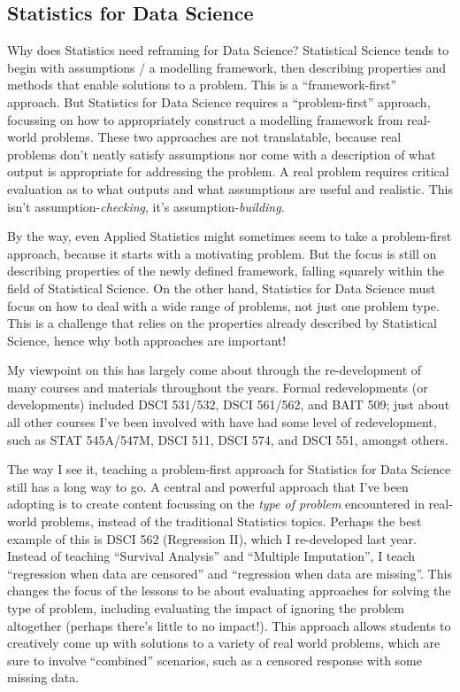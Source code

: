 \documentclass[]{article}
\begin{document}
\hypertarget{statistics-for-data-science}{%
\subsection{Statistics for Data Science}\label{statistics-for-data-science}}

Why does Statistics need reframing for Data Science? Statistical Science tends to begin with assumptions / a modelling framework, then describing properties and methods that enable solutions to a problem. This is a ``framework-first'' approach. But Statistics for Data Science requires a ``problem-first'' approach, focussing on how to appropriately construct a modelling framework from real-world problems. These two approaches are not translatable, because real problems don't neatly satisfy assumptions nor come with a description of what output is appropriate for addressing the problem. A real problem requires critical evaluation as to what outputs and what assumptions are useful and realistic. This isn't assumption-\emph{checking}, it's assumption-\emph{building}.

By the way, even Applied Statistics might sometimes seem to take a problem-first approach, because it starts with a motivating problem. But the focus is still on describing properties of the newly defined framework, falling squarely within the field of Statistical Science. On the other hand, Statistics for Data Science must focus on how to deal with a wide range of problems, not just one problem type. This is a challenge that relies on the properties already described by Statistical Science, hence why both approaches are important!

My viewpoint on this has largely come about through the re-development of many courses and materials throughout the years. Formal redevelopments (or developments) included DSCI 531/532, DSCI 561/562, and BAIT 509; just about all other courses I've been involved with have had some level of redevelopment, such as STAT 545A/547M, DSCI 511, DSCI 574, and DSCI 551, amongst others.

The way I see it, teaching a problem-first approach for Statistics for Data Science still has a long way to go. A central and powerful approach that I've been adopting is to create content focussing on the \emph{type of problem} encountered in real-world problems, instead of the traditional Statistics topics. Perhaps the best example of this is DSCI 562 (Regression II), which I re-developed last year. Instead of teaching ``Survival Analysis'' and ``Multiple Imputation'', I teach ``regression when data are censored'' and ``regression when data are missing''. This changes the focus of the lessons to be about evaluating approaches for solving the type of problem, including evaluating the impact of ignoring the problem altogether (perhaps there's little to no impact!). This approach allows students to creatively come up with solutions to a variety of real world problems, which are sure to involve ``combined'' scenarios, such as a censored response with some missing data.
\end{document}
